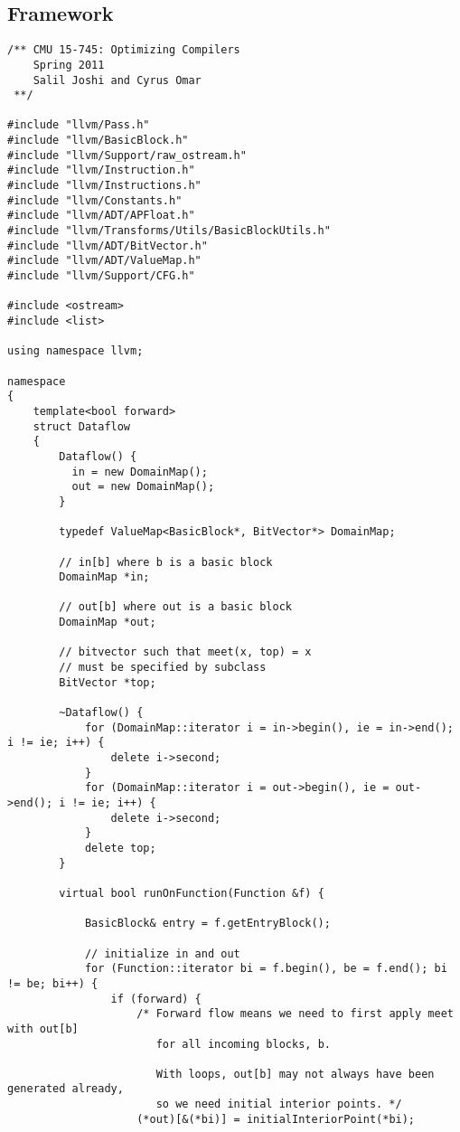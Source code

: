 \documentclass[12pt]{article}
\begin{document}
\subsection{Framework}
\begin{verbatim}
/** CMU 15-745: Optimizing Compilers
    Spring 2011
    Salil Joshi and Cyrus Omar
 **/

#include "llvm/Pass.h"
#include "llvm/BasicBlock.h"
#include "llvm/Support/raw_ostream.h"
#include "llvm/Instruction.h"
#include "llvm/Instructions.h"
#include "llvm/Constants.h"
#include "llvm/ADT/APFloat.h"
#include "llvm/Transforms/Utils/BasicBlockUtils.h"
#include "llvm/ADT/BitVector.h"
#include "llvm/ADT/ValueMap.h"
#include "llvm/Support/CFG.h"

#include <ostream>
#include <list>

using namespace llvm;

namespace
{
    template<bool forward>
    struct Dataflow 
    {
        Dataflow() {
          in = new DomainMap();
          out = new DomainMap();
        }
     
     	typedef ValueMap<BasicBlock*, BitVector*> DomainMap;
     	
     	// in[b] where b is a basic block
     	DomainMap *in;
     	
     	// out[b] where out is a basic block
     	DomainMap *out;
     	
		// bitvector such that meet(x, top) = x
		// must be specified by subclass
     	BitVector *top;
     	
        ~Dataflow() {
        	for (DomainMap::iterator i = in->begin(), ie = in->end(); i != ie; i++) {
            	delete i->second;
        	}
        	for (DomainMap::iterator i = out->begin(), ie = out->end(); i != ie; i++) {
            	delete i->second;
          	}
          	delete top;
        }
     	
        virtual bool runOnFunction(Function &f) {
        
            BasicBlock& entry = f.getEntryBlock();
            
            // initialize in and out
            for (Function::iterator bi = f.begin(), be = f.end(); bi != be; bi++) {
                if (forward) {
                	/* Forward flow means we need to first apply meet with out[b]
                	   for all incoming blocks, b.
                	   
                	   With loops, out[b] may not always have been generated already,
                	   so we need initial interior points. */
                	(*out)[&(*bi)] = initialInteriorPoint(*bi);
                	

\end{verbatim}
\end{document}
